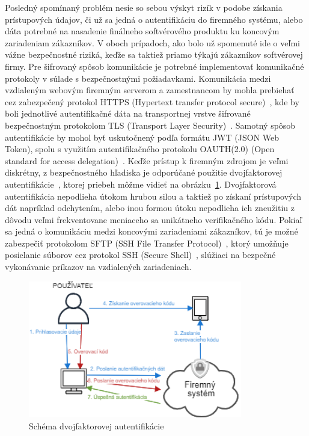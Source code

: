 Posledný spomínaný problém nesie so sebou výskyt rizík v podobe získania prístupových údajov, či už sa jedná o autentifikáciu
do firemného systému, alebo dáta potrebné na nasadenie finálneho softvérového produktu ku koncovým zariadeniam zákazníkov.
V oboch prípadoch, ako bolo už spomenuté ide o veľmi vážne bezpečnostné riziká, keďže sa taktiež priamo týkajú zákazníkov
softvérovej firmy.
Pre šifrovaný spôsob komunikácie je potrebné implementovať komunikačné protokoly v súlade s bezpečnostnými požiadavkami.
Komunikácia medzi vzdialeným webovým firemným serverom a zamestnancom by mohla prebiehať cez zabezpečený protokol
HTTPS (Hypertext transfer protocol secure)~\cite{HTTPS}, kde by boli jednotlivé autentifikačné dáta na transportnej vrstve
šifrované bezpečnostným protokolom TLS (Transport Layer Security)~\cite{TLS}.
Samotný spôsob autentifikácie by mohol byť uskutočnený podľa formátu JWT (JSON Web Token), spolu s využitím autentifikačného
protokolu OAUTH(2.0) (Open standard for access delegation)~\cite{JWT}.
Keďže prístup k firemným zdrojom je veľmi diskrétny, z bezpečnostného hľadiska je odporúčané použitie dvojfaktorovej
autentifikácie~\cite{DvojfaktorovaAutentifikacia}, ktorej priebeh môžme vidieť na obrázku~\ref{fig:obr_6}.
Dvojfaktorová autentifikácia nepodlieha útokom hrubou silou a taktiež po získaní prístupových dát napríklad odchytením,
alebo inou formou útoku nepodlieha ich zneužitiu z dôvodu veľmi frekventovane meniaceho sa unikátneho verifikačného kódu.
Pokiaľ sa jedná o komunikáciu medzi koncovými zariadeniami zákazníkov, tú je možné zabezpečiť protokolom SFTP (SSH File
Transfer Protocol)~\cite{SFTP}, ktorý umožňuje posielanie súborov cez protokol SSH (Secure Shell)~\cite{SSH}, slúžiaci
na bezpečné vykonávanie príkazov na vzdialených zariadeniach.

\begin{figure}[H]
\begin{center}\includegraphics[width=\textwidth,height=6cm,keepaspectratio=true]{assets/auth.png}\end{center}
\caption[Schéma dvojfaktorovej autentifikácie]{Schéma dvojfaktorovej autentifikácie}\label{fig:obr_6}
\end{figure}

